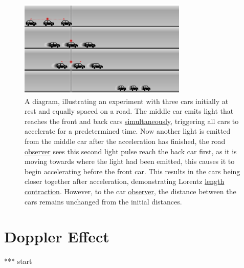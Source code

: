 \begin{figure}[H]
	\centering
	\includegraphics[width=8cm]{images/pdf/cars.pdf}
	\caption{A diagram, illustrating an experiment with three cars initially at rest and equally spaced on a road. The middle car emits light that reaches the front and back cars \protect\hyperlink{def-simultaneity}{simultaneously}, triggering all cars to accelerate for a predetermined time. Now another light is emitted from the middle car after the acceleration has finished, the road \protect\hyperlink{def-observer}{observer} sees this second light pulse reach the back car first, as it is moving towards where the light had been emitted, this causes it to begin accelerating before the front car. This results in the cars being closer together after acceleration, demonstrating Lorentz \protect\hyperlink{def-length-contraction}{length contraction}. However, to the car \protect\hyperlink{def-observer}{observer}, the distance between the cars remains unchanged from the initial distances.}
	\label{fig: cars}
\end{figure}

\section{Doppler Effect}

*** start

